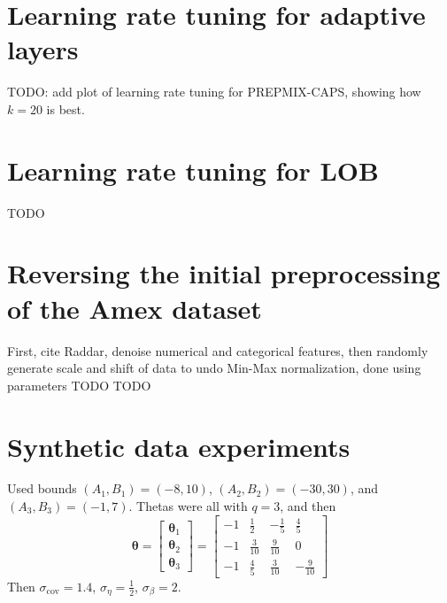 \documentclass{statsmsc}
\begin{document}
{\chapter{Learning rate tuning for adaptive layers}
\label{ch:lr_tuning}

TODO: add plot of learning rate tuning for \ac{PREPMIX-CAPS}, showing how $k=20$ is best.

\chapter{Learning rate tuning for LOB}
\label{ch:hyp_lob}

TODO

\chapter{Reversing the initial preprocessing of the Amex dataset}%
\label{ch:undo_amex_pre}

First, cite Raddar, denoise
numerical and categorical features, then randomly generate scale and shift of
data to undo Min-Max normalization, done using parameters TODO TODO

\chapter{Synthetic data experiments}
\label{ch:synth_data_appendix}

Used bounds
$(A_1,B_1)=(-8, 10)$, $(A_2,B_2)=(-30, 30)$, and $(A_3, B_3)=(-1, 7)$.
Thetas were all with $q=3$, and then
\begin{equation}
    \bm\theta=\begin{bmatrix}
        \bm\theta_1 \\
        \bm\theta_2 \\
        \bm\theta_3
    \end{bmatrix}
    =
    \begin{bmatrix}
        -1 & \frac{1}{2} & -\frac{1}{5} & \frac{4}{5} \\
        -1 & \frac{3}{10} & \frac{9}{10} & 0 \\
        -1 & \frac{4}{5} & \frac{3}{10} & -\frac{9}{10} 
    \end{bmatrix}
\end{equation}
Then $\sigma_{\textrm{cov}}=1.4$, $\sigma_{\eta}=\frac{1}{2}$, $\sigma_\beta=2$.

}
\end{document}
